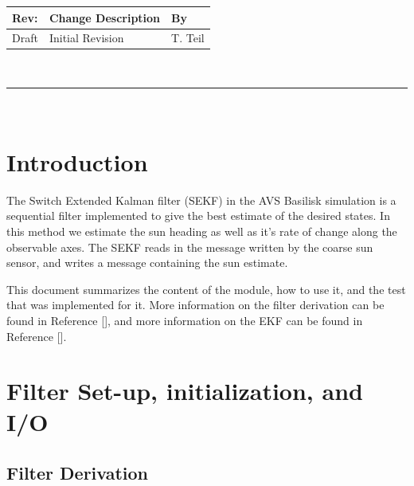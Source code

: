 \documentclass[]{BasiliskReportMemo}
\begin{document}
\makeCover



%
%
\pagestyle{empty}
{\renewcommand{\arraystretch}{2}
\noindent
\begin{longtable}{|p{0.5in}|p{4.5in}|p{1.14in}|}
\hline
{\bfseries Rev}: & {\bfseries Change Description} & {\bfseries By} \\
\hline
Draft & Initial Revision & T. Teil \\
\hline

\end{longtable}
}

\newpage
\setcounter{page}{1}
\pagestyle{fancy}

\tableofcontents
~\\ \hrule ~\\


\section{Introduction}
The Switch Extended Kalman filter (SEKF) in the AVS Basilisk simulation is a sequential
filter implemented to give the best estimate of the desired states.
In this method we estimate the sun heading as well as it's rate of change along the observable axes.
The SEKF reads in the message written by the coarse sun sensor, and writes a message 
containing the sun estimate. 

This document summarizes the content of the module, how to use it, and the test that 
was implemented for it. More information on the filter derivation can be found in Reference [], and more information on the EKF can be found in Reference [].


\section{Filter Set-up, initialization, and I/O}


\subsection{Filter Derivation} %
\end{document}

